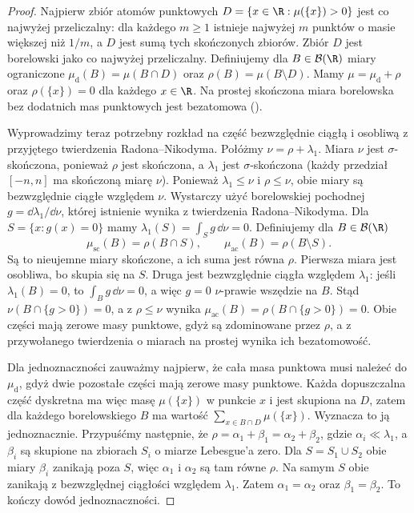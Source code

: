 \begin{proof}
Najpierw zbiór atomów punktowych
$D=\{x\in\R:\mu(\{x\})>0\}$ jest co najwyżej
przeliczalny: dla każdego $m\geq1$ istnieje najwyżej
$m$ punktów o masie większej niż $1/m$, a
$D$ jest sumą tych skończonych zbiorów.
Zbiór $D$ jest borelowski jako co najwyżej przeliczalny.
Definiujemy dla $B\in\mathcal B(\R)$ miary ograniczone
$\mu_{\mathrm d}(B)=\mu(B\cap D)$
oraz $\rho(B)=\mu(B\setminus D)$.
Mamy $\mu=\mu_{\mathrm d}+\rho$ oraz $\rho(\{x\})=0$ dla
każdego $x\in\R$. Na prostej skończona miara borelowska
bez dodatnich mas punktowych jest bezatomowa
().

Wyprowadzimy teraz potrzebny rozkład na część bezwzględnie
ciągłą i osobliwą z przyjętego twierdzenia
Radona--Nikodyma. Połóżmy $\nu=\rho+\lambda_1$.
Miara $\nu$ jest $\sigma$-skończona, ponieważ
$\rho$ jest skończona, a $\lambda_1$ jest
$\sigma$-skończona (każdy przedział $[-n,n]$ ma skończoną
miarę $\nu$). Ponieważ $\lambda_1\leq\nu$ i $\rho\leq\nu$,
obie miary są bezwzględnie ciągłe względem $\nu$.
Wystarczy użyć borelowskiej pochodnej
$g=\dd\lambda_1/\dd\nu$, której istnienie wynika z twierdzenia
Radona--Nikodyma. Dla $S=\{x:g(x)=0\}$ mamy
$\lambda_1(S)=\int_Sg\,\dd\nu=0$.
Definiujemy dla $B\in\mathcal B(\R)$
\[
\mu_{\mathrm{sc}}(B)=\rho(B\cap S),\qquad
\mu_{\mathrm{ac}}(B)=\rho(B\setminus S).
\]
Są to nieujemne miary skończone, a ich suma jest równa $\rho$.
Pierwsza miara jest osobliwa, bo skupia się na $S$.
Druga jest bezwzględnie ciągła względem $\lambda_1$:
jeśli $\lambda_1(B)=0$, to
$\int_B g\,\dd\nu=0$, a więc $g=0$
$\nu$-prawie wszędzie na $B$. Stąd
$\nu(B\cap\{g>0\})=0$, a z $\rho\leq\nu$ wynika
$\mu_{\mathrm{ac}}(B)=\rho(B\cap\{g>0\})=0$.
Obie części mają zerowe masy punktowe, gdyż są zdominowane
przez $\rho$, a z przywołanego twierdzenia o miarach
na prostej wynika ich bezatomowość.

Dla jednoznaczności zauważmy najpierw, że cała
masa punktowa musi należeć do $\mu_{\mathrm d}$,
gdyż dwie pozostałe części mają zerowe masy punktowe.
Każda dopuszczalna część dyskretna ma więc masę
$\mu(\{x\})$ w punkcie $x$ i jest skupiona na $D$,
zatem dla każdego borelowskiego $B$ ma wartość
$\sum_{x\in B\cap D}\mu(\{x\})$. Wyznacza to ją jednoznacznie.
Przypuśćmy następnie, że
$\rho=\alpha_1+\beta_1=\alpha_2+\beta_2$,
gdzie $\alpha_i\ll\lambda_1$, a $\beta_i$
są skupione na zbiorach $S_i$ o miarze Lebesgue'a zero.
Dla $S=S_1\cup S_2$ obie miary $\beta_i$
zanikają poza $S$, więc $\alpha_1$ i $\alpha_2$
są tam równe $\rho$. Na samym $S$ obie zanikają
z bezwzględnej ciągłości względem $\lambda_1$.
Zatem $\alpha_1=\alpha_2$ oraz
$\beta_1=\beta_2$. To kończy dowód jednoznaczności.
\end{proof}

